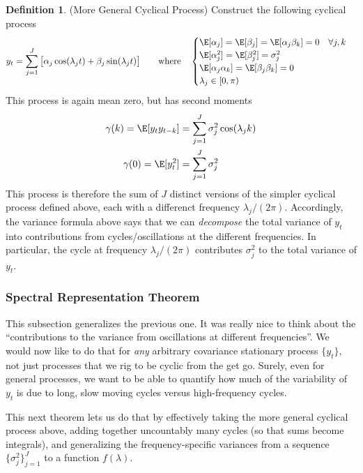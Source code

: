 \documentclass[12pt]{article}
\theoremstyle{plain}
\theoremstyle{definition}
\newtheorem{defn}[thm]{Definition}
\theoremstyle{remark}
\begin{document}
\begin{defn}(More General Cyclical Process)
Construct the following cyclical process
\begin{align*}
  y_t = \sum_{j=1}^J \big[
    \alpha_j \cos(\lambda_j t)
    + \beta_j \sin(\lambda_j t)
  \big]
  \qquad
  \text{where}\quad
  \begin{cases}
    \E[\alpha_j] = \E[\beta_j] = \E[\alpha_j \beta_k] = 0
    \quad \forall j,k
    \\
    \E[\alpha_j^2] = \E[\beta_j^2] = \sigma^2_j
    \\
    \E[\alpha_j\alpha_k] = \E[\beta_j\beta_k] = 0
    \\
    \lambda_j \in [0,\pi)
  \end{cases}
\end{align*}
This process is again mean zero, but has second moments
\begin{align*}
  \gamma(k) = \E[y_ty_{t-k}]
  &= \sum_{j=1}^J \sigma_j^2\cos(\lambda_j k) \\
  \gamma(0) = \E[y_t^2] &= \sum_{j=1}^J \sigma_j^2
\end{align*}
This process is therefore the sum of $J$ distinct versions of the
simpler cyclical process defined above, each with a differenct frequency
$\lambda_j/(2\pi)$.
Accordingly, the variance formula above says that we can
\emph{decompose} the total variance of $y_t$ into contributions from
cycles/oscillations at the different frequencies. In particular, the
cycle at frequency $\lambda_j/(2\pi)$ contributes $\sigma^2_j$ to the
total variance of $y_t$.
\end{defn}


\clearpage
\subsubsection{Spectral Representation Theorem}

This subsection generalizes the previous one. It was really
nice to think about the ``contributions to the variance from
oscillations at different frequencies''. We would now like to do that
for \emph{any} arbitrary covariance stationary process $\{y_t\}$, not
just processes that we rig to be cyclic from the get go. Surely,
even for general processes, we want to be able to quantify how much of
the variability of $y_t$ is due to long, slow moving cycles versus
high-frequency cycles.

This next theorem lets us do that by effectively taking the more general
cyclical process above, adding together uncountably many cycles (so that
sums become integrals), and generalizing the frequency-specific
variances from a sequence $\{\sigma_j^2\}_{j=1}^J$ to a function
$f(\lambda)$.
\end{document}

